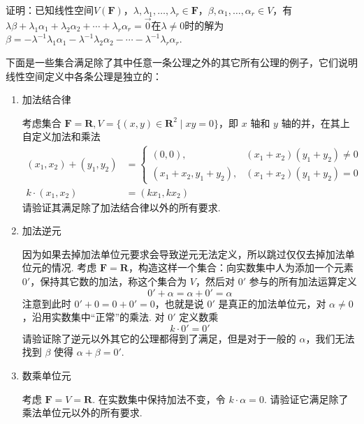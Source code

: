 \begin{exercise}
    \begin{exgroup}
        \item 证明：已知线性空间$V(\mathbf{F})$，$\lambda,\lambda_1,\ldots,\lambda_r\in\mathbf{F}$，$\beta,\alpha_1,\ldots,\alpha_r\in V$，有$\lambda\beta+\lambda_1\alpha_1+\lambda_2\alpha_2+\cdots+\lambda_r\alpha_r=\vec{0}$在$\lambda\neq 0$时的解为$\beta=-\lambda^{-1}\lambda_1\alpha_1-\lambda^{-1}\lambda_2\alpha_2-\cdots-\lambda^{-1}\lambda_r\alpha_r$.

        \item \label{item:2:去除一条线性空间公理}
        下面是一些集合满足除了其中任意一条公理之外的其它所有公理的例子，它们说明线性空间定义中各条公理是独立的：
        \begin{enumerate}
            \item 加法结合律

            考虑集合 $\mathbf{F} = \mathbf{R}, V = \{(x, y)\in\mathbf{R}^2 \mid xy = 0\}$，即 $x$ 轴和 $y$ 轴的并，在其上自定义加法和乘法
            \begin{align*}
                (x_1, x_2) + (y_1, y_2) &= \begin{cases}
                    (0, 0), & (x_1+x_2)(y_1+y_2) \neq 0 \\
                    (x_1+x_2, y_1+y_2), & (x_1+x_2)(y_1+y_2) = 0
                \end{cases} \\
                k\cdot (x_1, x_2) &= (k x_1, k x_2)
            \end{align*}
            请验证其满足除了加法结合律以外的所有要求.

            \item 加法逆元

            因为如果去掉加法单位元要求会导致逆元无法定义，所以跳过仅仅去掉加法单位元的情况. 考虑 $\mathbf{F} = \mathbf{R}$，构造这样一个集合：向实数集中人为添加一个元素 $0'$，保持其它数的加法，称这个集合为 $V$，然后对 $0'$ 参与的所有加法运算定义
            \[
                0' + \alpha = \alpha + 0' = \alpha
            \]
            注意到此时 $0' + 0 = 0 + 0' = 0$，也就是说 $0'$ 是真正的加法单位元，对 $\alpha \neq 0$，沿用实数集中``正常''的乘法. 对 $0'$ 定义数乘
            \[
                k \cdot 0' = 0'
            \]
            请验证除了逆元以外其它的公理都得到了满足，但是对于一般的 $\alpha$，我们无法找到 $\beta$ 使得 $\alpha + \beta = 0'$.

            \item 数乘单位元

            考虑 $\mathbf{F} = V = \mathbf{R}$. 在实数集中保持加法不变，令 $k\cdot \alpha = 0$. 请验证它满足除了乘法单位元以外的所有要求.


\end{enumerate}
\end{exgroup}
\end{exercise}

